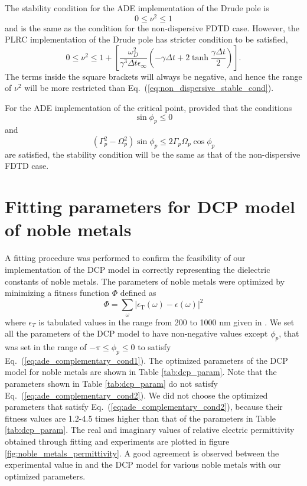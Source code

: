 The stability condition for the ADE implementation of the Drude pole is 
\begin{equation}
0 \le \nu^2 \le 1
\label{eq:non_dispersive_stable_cond}
\end{equation}
and is the same as the condition for the non-dispersive FDTD case. However, the PLRC implementation of the Drude pole has stricter condition to be satisfied,
\begin{equation}
0 \le \nu^2 \le 1 + \left[\frac{\omega _D^2}{\gamma^3 \Delta t \epsilon_\infty} \left( -\gamma  \Delta t + 2 \tanh \frac{\gamma \Delta t}{2} \right)\right].
\end{equation}
The terms inside the square brackets will always be negative, and hence the range of $\nu^2$ will be more restricted than Eq.~(\ref{eq:non_dispersive_stable_cond}). 

For the ADE implementation of the critical point, provided that the conditions
\begin{equation}
\sin \phi_p \le 0
\label{eq:ade_complementary_cond1}
\end{equation}
and
\begin{equation}
\left( \Gamma_p^2 - \Omega_p^2 \right) \sin \phi_p  \le 2 \Gamma_p \Omega_p \cos \phi_p
\label{eq:ade_complementary_cond2}
\end{equation}
are satisfied, the stability condition will be the same as that of the non-dispersive FDTD case.

\section{Fitting parameters for DCP model of noble metals}
A fitting procedure was performed to confirm the feasibility of our implementation of the DCP model in correctly representing the dielectric constants of noble metals. The parameters of noble metals were optimized by minimizing a fitness function $\Phi$ defined as
\begin{equation}
\Phi = \sum_\omega \left| \epsilon_\text{T}(\omega) - \epsilon(\omega)\right|^2
\end{equation}
where $\epsilon_T$ is tabulated values in the range from 200 to 1000 nm given in \citet{johnson_optical_1972}. We set all the parameters of the DCP model to have non-negative values except $\phi_p$, that was set in the range of $-\pi \le \phi_p \le 0$ to satisfy Eq.~(\ref{eq:ade_complementary_cond1}). The optimized parameters of the DCP model for noble metals are shown in Table \ref{tab:dcp_param}. Note that the parameters shown in Table \ref{tab:dcp_param} do not satisfy Eq.~(\ref{eq:ade_complementary_cond2}). We did not choose the optimized parameters that satisfy Eq.~(\ref{eq:ade_complementary_cond2}), because their fitness values are 1.2-4.5 times higher than that of the parameters in Table \ref{tab:dcp_param}. The real and imaginary values of relative electric permittivity obtained through fitting and experiments are plotted in figure \ref{fig:noble_metals_permittivity}. A good agreement is observed between the experimental value in \citet{johnson_optical_1972} and the DCP model for various noble metals with our optimized parameters.

